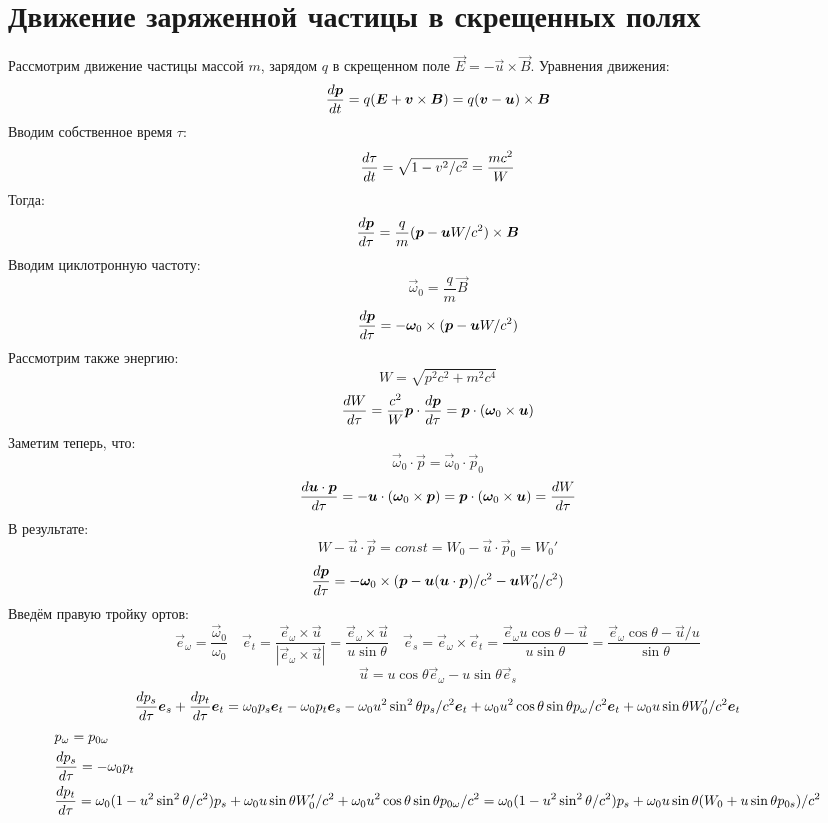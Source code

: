 \section{Движение заряженной частицы в скрещенных полях}
Рассмотрим движение частицы массой $m$, зарядом $q$ в скрещенном поле $\vec{E} = -\vec{u}\times\vec{B}$. Уравнения движения:
\[
	\frac{d \boldsymbol{p}}{d t} = q (\boldsymbol{E} + \boldsymbol{v} \times \boldsymbol{B}) =
	q (\boldsymbol{v} - \boldsymbol{u})\times\boldsymbol{B}
\]
Вводим собственное время $\tau$:
\[
	\frac{d \tau}{d t} = \sqrt{1 - v^2/c^2} = \frac{mc^2}{W}
\]
Тогда:
\[
	\frac{d \boldsymbol{p}}{d \tau} =
	\frac{q}{m} (\boldsymbol{p} - \boldsymbol{u}W/c^2)\times\boldsymbol{B}
\]
Вводим циклотронную частоту:
\[
	\vec{\omega}_0 = \frac{q}{m}\vec{B}
\]
\[
	\frac{d \boldsymbol{p}}{d \tau} =
	- \boldsymbol{\omega}_0\times(\boldsymbol{p} - \boldsymbol{u}W/c^2)
\]
Рассмотрим также энергию:
\[
	W = \sqrt{p^2c^2 + m^2 c^4}
\]
\[
	\frac{d W}{d \tau} = \frac{c^2}{W} \boldsymbol{p}\cdot\frac{d \boldsymbol{p}}{d \tau} = 
	\boldsymbol{p}\cdot(\boldsymbol{\omega}_0\times\boldsymbol{u})
\]
Заметим теперь, что:
\[
	\vec{\omega}_0 \cdot \vec{p} = \vec\omega_0 \cdot \vec{p}_0
\]
\[
	\frac{d \boldsymbol{u}\cdot\boldsymbol{p}}{d \tau} = - \boldsymbol{u}\cdot(\boldsymbol{\omega}_0\times\boldsymbol{p}) = \boldsymbol{p}\cdot(\boldsymbol{\omega}_0\times\boldsymbol{u}) = \frac{d W}{d \tau} 
\]
В результате:
\[	
	W - \vec{u}\cdot\vec{p} = const = W_0 - \vec{u}\cdot\vec{p}_0 = W_0'
\]
\[
	\frac{d \boldsymbol{p}}{d \tau} =
	- \boldsymbol{\omega}_0\times(\boldsymbol{p} - \boldsymbol{u}(\boldsymbol{u}\cdot\boldsymbol{p})/c^2 -\boldsymbol{u} W_0'/c^2)
\]
Введём правую тройку ортов:
\[
	\vec{e}_\omega = \frac{\vec\omega_0}{\omega_0} \quad
	\vec{e}_t = \frac{\vec{e}_\omega \times \vec{u}}{|\vec{e}_\omega \times \vec{u}|} = \frac{\vec{e}_\omega \times \vec{u}}{u\sin \theta} \quad
	\vec{e}_s = \vec{e}_\omega\times\vec{e}_t = \frac{\vec{e}_\omega u \cos \theta - \vec{u}}{u\sin \theta} = \frac{\vec{e}_\omega \cos \theta - \vec{u}/u}{\sin \theta}
\]
\[
	\vec{u} = u \cos \theta \vec{e}_\omega - u \sin \theta \vec{e}_s
\]
\[
	\frac{d p_s}{d \tau} \boldsymbol{e}_s + \frac{d p_t}{d \tau} \boldsymbol{e}_t =
	\omega_0 p_s \boldsymbol{e}_t - 
	\omega_0 p_t \boldsymbol{e}_s - 
	\omega_0 u^2 \sin^2 \theta p_s/c^2 \boldsymbol{e}_t + 
	\omega_0 u^2 \cos \theta \sin \theta p_\omega /c^2 \boldsymbol{e}_t +
	\omega_0 u \sin \theta W_0'/c^2 \boldsymbol{e}_t
\]
\[	
	\begin{aligned}
	& p_\omega = p_{0\omega} \\
	& \frac{d p_s}{d \tau} = - \omega_0 p_t \\
	& \frac{d p_t}{d \tau} = \omega_0 (1 - u^2 \sin^2 \theta/c^2) p_s + \omega_0 u \sin \theta W_0'/c^2 + \omega_0 u^2 \cos \theta \sin \theta p_{0\omega} /c^2 =
	\omega_0 (1 - u^2 \sin^2 \theta/c^2) p_s + \omega_0 u \sin \theta (W_0 + u \sin \theta p_{0s})/c^2
	\end{aligned}
\]

